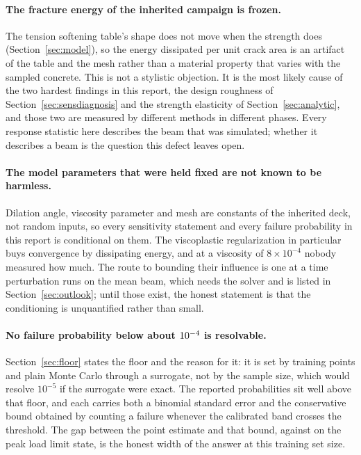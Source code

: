 \documentclass[11pt,a4paper]{article}
\begin{document}
\paragraph{The fracture energy of the inherited campaign is frozen.}
The tension softening table's shape does not move when the strength does
(Section~\ref{sec:model}), so the energy dissipated per unit crack area is an artifact of the
table and the mesh rather than a material property that varies with the sampled concrete. This
is not a stylistic objection. It is the most likely cause of the two hardest findings in this
report, the design roughness of Section~\ref{sec:sensdiagnosis} and the strength elasticity of
Section~\ref{sec:analytic}, and those two are measured by different methods in different
phases. Every response statistic here describes the beam that was simulated; whether it
describes a beam is the question this defect leaves open.

\paragraph{The model parameters that were held fixed are not known to be harmless.}
Dilation angle, viscosity parameter and mesh are constants of the inherited deck, not random
inputs, so every sensitivity statement and every failure probability in this report is
conditional on them. The viscoplastic regularization in particular buys convergence by
dissipating energy, and at a viscosity of $8 \times 10^{-4}$ nobody measured how much. The
route to bounding their influence is one at a time perturbation runs on the mean beam, which
needs the solver and is listed in Section~\ref{sec:outlook}; until those exist, the honest
statement is that the conditioning is unquantified rather than small.

\paragraph{No failure probability below about $10^{-4}$ is resolvable.}
Section~\ref{sec:floor} states the floor and the reason for it: it is set by \NValid{} training
points and plain Monte Carlo through a surrogate, not by the \MCSamples{} sample size, which
would resolve $10^{-5}$ if the surrogate were exact. The reported probabilities sit well above
that floor, and each carries both a binomial standard error and the conservative bound obtained
by counting a failure whenever the calibrated band crosses the threshold. The gap between the
point estimate and that bound, \PfPeak{} against \PfPeakBound{} on the peak load limit state, is
the honest width of the answer at this training set size.
\end{document}
